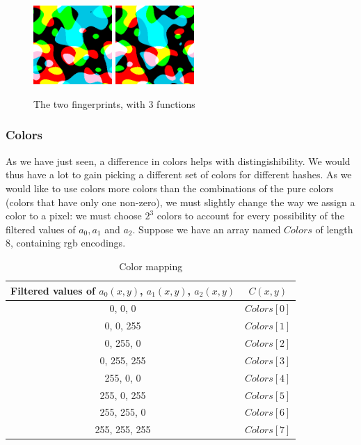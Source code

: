 \documentclass{article}
\begin{document}
\begin{center}
\begin{figure}
    \centering
    \includegraphics[width=3cm]{figures/ThreeFuncs.png}
    \hspace{4pt}
    \includegraphics[width=3cm]{figures/ThreeFuncsP67Psi0232.png}
    \caption{The two fingerprints, with 3 functions}
    \label{fig:threeFuncs}
\end{figure}
\end{center}

\subsubsection{Colors}

As we have just seen, a difference in colors helps with distingishibility. We would thus have a lot to gain picking a different set of colors for different hashes. As we would like to use colors more colors than the combinations of the pure colors (colors that have only one non-zero), we must slightly change the way we assign a color to a pixel: we must choose $2^3$ colors to account for every possibility of the filtered values of $a_0, a_1$ and $a_2$. Suppose we have an array named $Colors$ of length 8, containing rgb encodings.
\begin{table}
	\begin{center}
	\begin{tabular}{c|c}
		Filtered values of $a_0(x,y)$, $a_1(x,y)$, $a_2(x,y)$ & $C(x,y)$\\
		\hline 0,   0,   0 & $Colors[0]$\\
		 0,   0, 255 & $Colors[1]$\\
		 0, 255,   0 & $Colors[2]$\\
		 0, 255, 255 & $Colors[3]$\\
		 255,   0,   0 & $Colors[4]$\\
		 255,   0, 255 & $Colors[5]$\\
		 255, 255,   0 & $Colors[6]$\\
		255, 255, 255 & $Colors[7]$\\
	\end{tabular}
	\caption{Color mapping}
	\end{center}
\end{table}
\end{document}
